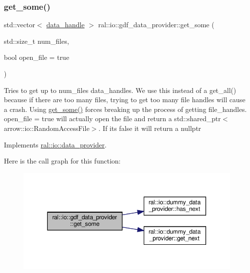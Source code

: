 \subsubsection{\texorpdfstring{get\+\_\+some()}{get\_some()}}
{\footnotesize\ttfamily std\+::vector$<$ \hyperlink{structral_1_1io_1_1data__handle}{data\+\_\+handle} $>$ ral\+::io\+::gdf\+\_\+data\+\_\+provider\+::get\+\_\+some (\begin{DoxyParamCaption}\item[{std\+::size\+\_\+t}]{num\+\_\+files,  }\item[{bool}]{open\+\_\+file = {\ttfamily true} }\end{DoxyParamCaption})\hspace{0.3cm}{\ttfamily [virtual]}}

Tries to get up to num\+\_\+files data\+\_\+handles. We use this instead of a get\+\_\+all() because if there are too many files, trying to get too many file handles will cause a crash. Using \hyperlink{classral_1_1io_1_1gdf__data__provider_a26fdba323411bb0b8270f735e6e5ee77}{get\+\_\+some()} forces breaking up the process of getting file\+\_\+handles. open\+\_\+file = true will actually open the file and return a std\+::shared\+\_\+ptr$<$arrow\+::io\+::\+Random\+Access\+File$>$. If its false it will return a nullptr 

Implements \hyperlink{classral_1_1io_1_1data__provider_ae65c935f9812ac3321b0c814fa4a5548}{ral\+::io\+::data\+\_\+provider}.

Here is the call graph for this function\+:\nopagebreak
\begin{figure}[H]
\begin{center}
\leavevmode
\includegraphics[width=343pt]{classral_1_1io_1_1gdf__data__provider_a26fdba323411bb0b8270f735e6e5ee77_cgraph}
\end{center}
\end{figure}
\mbox{\label{classral_1_1io_1_1gdf__data__provider_af7ad84e9da11d439efe9328db3531855}} 
